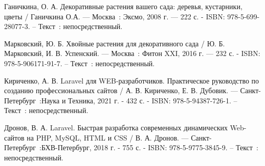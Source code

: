 \begin{thebibliography}{9}
	 Ганичкина, О. А. Декоративные растения вашего сада: деревья, кустарники, цветы / Ганичкина О.А. —  Москва~: Эксмо, 2008 г. —  222 с. - ISBN: 978-5-699-28077-3. – Текст~: непосредственный.
	
	 Марковский, Ю. Б. Хвойные растения для декоративного сада / Ю. Б. Марковский, И. В. Успенский. — Москва~: Фитон XXI, 2016 г. — 232 с. - ISBN: 978-5-906171-91-7. – Текст~: непосредственный.
	
	 Кириченко, А. В. Laravel для WEB-разработчиков. Практическое руководство по созданию профессиональных сайтов / А. В. Кириченко, Е. В. Дубовик. — Санкт-Петербург~:Наука и Техника, 2021 г. - 432 с. - ISBN: 
	978-5-94387-726-1. – Текст~: непосредственный.
	
	 Дронов, В. А. Laravel. Быстрая разработка современных динамических Web-сайтов на PHP, MySQL, HTML и CSS / В. А. Дронов. — Санкт-Петербург~:БХВ-Петербург, 2018 г. - 755 с. - ISBN: 978-5-9775-3845-9. – Текст~: непосредственный.
\end{thebibliography}
